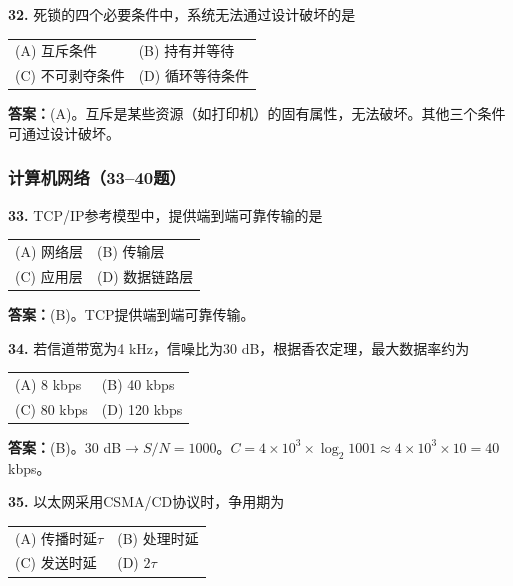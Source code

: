 \noindent\textbf{32.} 死锁的四个必要条件中，系统无法通过设计破坏的是
\begin{center}
\begin{tabular}{ll}
(A) 互斥条件 & (B) 持有并等待 \\[6pt]
(C) 不可剥夺条件 & (D) 循环等待条件
\end{tabular}
\end{center}

\ifshowsolutions\par\noindent\textbf{答案：}(A)。互斥是某些资源（如打印机）的固有属性，无法破坏。其他三个条件可通过设计破坏。\else \answerarea \fi

\subsubsection*{计算机网络（33--40题）}

\noindent\textbf{33.} TCP/IP参考模型中，提供端到端可靠传输的是
\begin{center}
\begin{tabular}{ll}
(A) 网络层 & (B) 传输层 \\[6pt]
(C) 应用层 & (D) 数据链路层
\end{tabular}
\end{center}

\ifshowsolutions\par\noindent\textbf{答案：}(B)。TCP提供端到端可靠传输。\else \answerarea \fi

\vspace{6pt}

\noindent\textbf{34.} 若信道带宽为4 kHz，信噪比为30 dB，根据香农定理，最大数据率约为
\begin{center}
\begin{tabular}{ll}
(A) 8 kbps & (B) 40 kbps \\[6pt]
(C) 80 kbps & (D) 120 kbps
\end{tabular}
\end{center}

\ifshowsolutions\par\noindent\textbf{答案：}(B)。30 dB$\to S/N=1000$。$C=4\times10^3\times\log_2 1001\approx 4\times10^3\times10=40$ kbps。\else \answerarea \fi

\vspace{6pt}

\noindent\textbf{35.} 以太网采用CSMA/CD协议时，争用期为
\begin{center}
\begin{tabular}{ll}
(A) 传播时延$\tau$ & (B) 处理时延 \\[6pt]
(C) 发送时延 & (D) $2\tau$
\end{tabular}
\end{center}

